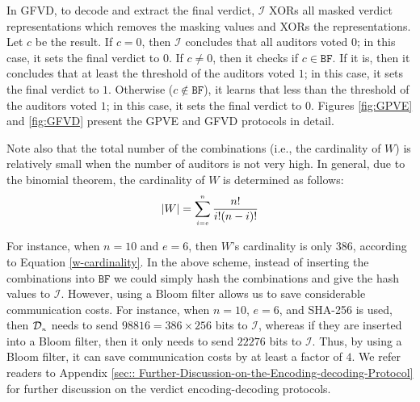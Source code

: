 In GFVD, to decode and extract the final verdict,  $\mathcal{I}$  XORs all masked verdict representations which removes the masking values and XORs the representations. Let $c$ be the result.  If $c=0$, then $\mathcal{I}$ concludes that all auditors voted $0$; in this case, it sets the final verdict to $0$. If $c\neq 0$, then it checks if $c\in \mathtt{BF}$. If it is, then it concludes that at least the threshold of the auditors voted $1$; in this case,  it sets the final verdict to $1$. Otherwise ($c\notin \mathtt{BF}$), it learns that less than the threshold of the auditors voted $1$; in this case, it sets the final verdict to $0$. Figures \ref{fig:GPVE} and \ref{fig:GFVD} present the  GPVE and GFVD protocols in detail. 
%



Note also that the total number of the combinations (i.e., the cardinality of $W$) is relatively small when the number of auditors is not very high. In general,  due to the  binomial theorem, the cardinality of $W$ is determined as follows:
%
\begin{equation}\label{w-cardinality}
|W|=\sum\limits_{\scriptscriptstyle i=e}^{\scriptscriptstyle n}\frac{n!}{i!(n- i)!}
 \end{equation}
 
 For instance, when $n=10$ and  $e=6$, then $W$'s cardinality is only $386$, according to Equation \ref{w-cardinality}.  In the above scheme, instead of inserting the combinations into $\mathtt{BF}$ we could simply hash  the combinations and give the hash values to $\mathcal{I}$. However, using a Bloom filter allows us to save considerable communication costs. For instance, when $n=10$, $e=6$, and SHA-256 is used, then $\mathcal{D}_{\scriptscriptstyle n}$ needs to send  $98816=386\times 256$ bits to $\mathcal{I}$, whereas  if they are inserted into a Bloom filter, then it only needs to send $22276 $ bits to $\mathcal{I}$. Thus, by using a Bloom filter,  it  can save  communication costs by at least a factor of  $4$. We refer readers to Appendix \ref{sec:: Further-Discussion-on-the-Encoding-decoding-Protocol} for  further discussion on the verdict encoding-decoding protocols. 
 
 
 
 

 
 





